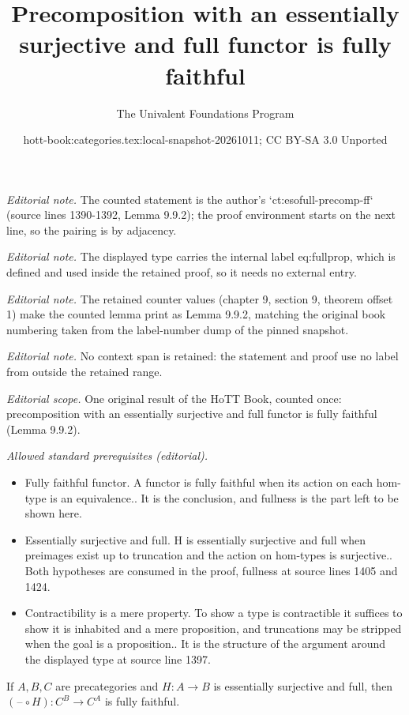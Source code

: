 \documentclass[10pt,a4paper]{article}
\title{Precomposition with an essentially surjective and full functor is fully faithful}
\author{The Univalent Foundations Program}
\date{hott-book:categories.tex:local-snapshot-20261011; CC BY-SA 3.0 Unported}
\newcounter{chapter}
\newcommand{\blank}{\mathord{\hspace{1pt}\text{--}\hspace{1pt}}}
\theoremstyle{definition}
\theoremstyle{remark}
\numberwithin{equation}{section}
\begin{document}
\maketitle
\setcounter{chapter}{9}
\setcounter{section}{9}
\setcounter{thm}{1}
\noindent\textit{Editorial note.} The counted statement is the author's `ct:esofull-precomp-ff` (source lines 1390-1392, Lemma 9.9.2); the proof environment starts on the next line, so the pairing is by adjacency.\par\medskip
\noindent\textit{Editorial note.} The displayed type carries the internal label eq:fullprop, which is defined and used inside the retained proof, so it needs no external entry.\par\medskip
\noindent\textit{Editorial note.} The retained counter values (chapter 9, section 9, theorem offset 1) make the counted lemma print as Lemma 9.9.2, matching the original book numbering taken from the label-number dump of the pinned snapshot.\par\medskip
\noindent\textit{Editorial note.} No context span is retained: the statement and proof use no label from outside the retained range.\par\medskip
\noindent\textit{Editorial scope.} One original result of the HoTT Book, counted once: precomposition with an essentially surjective and full functor is fully faithful (Lemma 9.9.2).\par\medskip
\noindent\textit{Allowed standard prerequisites (editorial).}\begin{itemize}
\item Fully faithful functor. A functor is fully faithful when its action on each hom-type is an equivalence.. It is the conclusion, and fullness is the part left to be shown here.
\item Essentially surjective and full. H is essentially surjective and full when preimages exist up to truncation and the action on hom-types is surjective.. Both hypotheses are consumed in the proof, fullness at source lines 1405 and 1424.
\item Contractibility is a mere property. To show a type is contractible it suffices to show it is inhabited and a mere proposition, and truncations may be stripped when the goal is a proposition.. It is the structure of the argument around the displayed type at source line 1397.
\end{itemize}\medskip
\begin{lem}\label{ct:esofull-precomp-ff}
  If $A,B,C$ are precategories and $H:A\to B$ is essentially surjective and full, then $(\blank\circ H):C^B \to C^A$ is fully faithful.
\end{lem}
\end{document}
